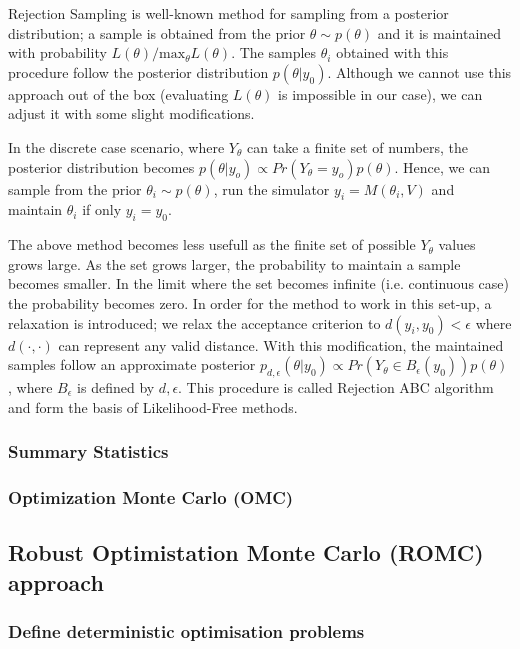 \documentclass[11pt,twoside]{article}
\numberwithin{Theorem}{section}
\numberwithin{Definition}{section}
\numberwithin{Lemma}{section}
\numberwithin{Algorithm}{section}
\numberwithin{equation}{section}
\begin{document}
Rejection Sampling is well-known method for sampling from a posterior distribution; a sample is obtained from the prior $\theta \sim p(\theta)$ and it is maintained with probability $L(\theta)/\text{max}_\theta L(\theta)$. The samples $\theta_i$ obtained with this procedure follow the posterior distribution $p(\theta|y_0)$. Although we cannot use this approach out of the box (evaluating $L(\theta)$ is impossible in our case), we can adjust it with some slight modifications.

In the discrete case scenario, where $Y_\theta$ can take a finite set of numbers, the posterior distribution becomes $p(\theta|y_o) \propto Pr(Y_\theta=y_o)p(\theta)$. Hence, we can sample from the prior $\theta_i \sim p(\theta)$, run the simulator $y_i = M(\theta_i, V)$ and maintain $\theta_i$ if only $y_i = y_0$.

The above method becomes less usefull as the finite set of possible $Y_\theta$ values grows large. As the set grows larger, the probability to maintain a sample becomes smaller. In the limit where the set becomes infinite (i.e. continuous case) the probability becomes zero. In order for the method to work in this set-up, a relaxation is introduced; we relax the acceptance criterion to $d(y_i, y_0) < \epsilon$ where $d(\cdot, \cdot)$ can represent any valid distance. With this modification, the maintained samples follow an approximate posterior $p_{d,\epsilon}(\theta|y_0) \propto Pr(Y_\theta \in B_\epsilon(y_0))p(\theta)$, where $B_\epsilon$ is defined by $d, \epsilon$. This procedure is called Rejection ABC algorithm and form the basis of Likelihood-Free methods.

\subsubsection{Summary Statistics}

\subsubsection{Optimization Monte Carlo (OMC)}

\clearpage

\subsection{Robust Optimistation Monte Carlo (ROMC) approach}
\label{sec:Techniques}

\subsubsection{Define deterministic optimisation problems}
\end{document}
